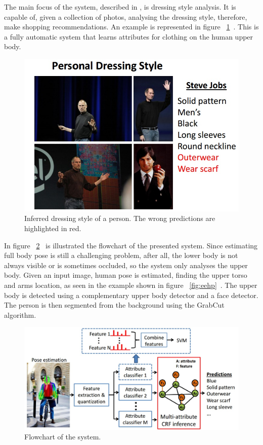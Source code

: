 \documentclass[titlepage,12pt,a4paper,times]{book}
\begin{document}
The main focus of the system, described in \citep{2}, is dressing style
analysis. It is capable of, given a collection of photos, analysing the
dressing style, therefore, make shopping recommendations. An example is
represented in figure ~\ref{fig:ids}~\citep{2}. This is a fully automatic
system that learns attributes for clothing on the human upper body.

\begin{figure}[!h]
\centering
\includegraphics[scale=0.7]{images/2_3_fig0.jpg}
\caption{Inferred dressing style of a person. The wrong predictions are
highlighted in red.}
\label{fig:ids}
\end{figure}
\FloatBarrier

In figure ~\ref{fig:fc}~\citep{2} is illustrated the flowchart of the presented
system. Since estimating full body pose is still a challenging problem, after
all, the lower body is not always visible or is sometimes occluded, so the
system only analyses the upper body. Given an input image, human pose is
estimated, finding the upper torso and arms location, as seen in the example
shown in figure ~\ref{fig:eehp}~\citep{2}. The upper body is detected using a
complementary upper body detector and a face detector. The person is then
segmented from the background using the GrabCut~\citep{7} algorithm.

\begin{figure}[!h]
\centering
\includegraphics[scale=0.5]{images/2_3_fig2.jpg}
\caption{Flowchart of the system.}
\label{fig:fc}
\end{figure}
\FloatBarrier
\end{document}
